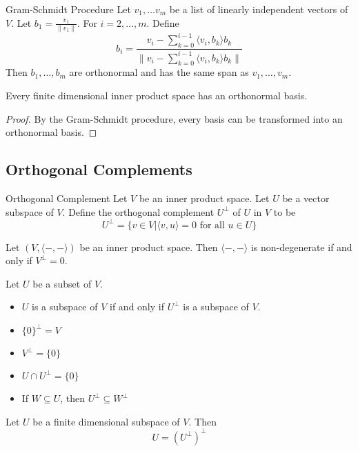 \documentclass[a4paper]{article}
\begin{document}
\begin{thm}{Gram-Schmidt Procedure}{} Let $v_1,\dots v_m$ be a list of linearly independent vectors of $V$. Let $b_1=\frac{v_1}{\|v_1\|}$. For $i=2,\dots,m$. Define $$b_i=\frac{v_i-\sum_{k=0}^{i-1}\langle v_i,b_k\rangle b_k}{\|v_i-\sum_{k=0}^{i-1}\langle v_i,b_k\rangle b_k\|}$$ Then $b_1,\dots,b_m$ are orthonormal and has the same span as $v_1,\dots,v_m$. 
\end{thm}

\begin{thm}{}{} Every finite dimensional inner product space has an orthonormal basis. \tcbline
\begin{proof}
By the Gram-Schmidt procedure, every basis can be transformed into an orthonormal basis. 
\end{proof}
\end{thm}

\subsection{Orthogonal Complements}
\begin{defn}{Orthogonal Complement}{} Let $V$ be an inner product space. Let $U$ be a vector subspace of $V$. Define the orthogonal complement $U^\perp$ of $U$ in $V$ to be $$U^{\perp}=\{v\in V|\langle v,u\rangle=0\text{ for all }u\in U\}$$
\end{defn}

\begin{lmm}{}{} Let $(V,\langle-,-\rangle)$ be an inner product space. Then $\langle-,-\rangle$ is non-degenerate if and only if $V^\perp=0$. 
\end{lmm}

\begin{prp}{}{} Let $U$ be a subset of $V$. 
\begin{itemize}
\item $U$ is a subspace of $V$ if and only if $U^\perp$ is a subspace of $V$. 
\item $\{0\}^\perp=V$
\item $V^\perp=\{0\}$
\item $U\cap U^\perp=\{0\}$
\item If $W\subseteq U$, then $U^\perp\subseteq W^\perp$
\end{itemize}
\end{prp}

\begin{prp}{}{} Let $U$ be a finite dimensional subspace of $V$. Then $$U=(U^\perp)^\perp$$
\end{prp}
\end{document}
